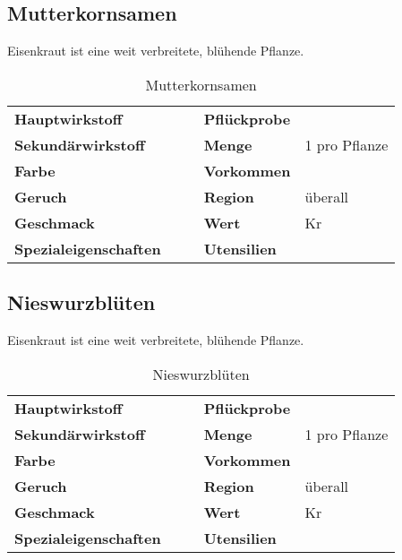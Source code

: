 \subsection{Mutterkornsamen}
Eisenkraut ist eine weit verbreitete, blühende Pflanze. 

\begin{table}[h]
\begin{center}
\begin{tabular}{|l|l|p{1cm}|l|l|}
	\cline{1-2} \cline{4-5}
	\textbf{Hauptwirkstoff} &  && \textbf{Pflückprobe} &  \\ \cline{1-2} \cline{4-5}
	\textbf{Sekundärwirkstoff} &  && \textbf{Menge} & 1 pro Pflanze \\ \cline{1-2} \cline{4-5}
	\textbf{Farbe} &  && \textbf{Vorkommen} &  \\ \cline{1-2} \cline{4-5}
	\textbf{Geruch} &  && \textbf{Region} & überall \\ \cline{1-2} \cline{4-5}
	\textbf{Geschmack} &  && \textbf{Wert} & Kr \\ \cline{1-2} \cline{4-5}
	\textbf{Spezialeigenschaften} &  && \textbf{Utensilien} &  \\ \cline{1-2} \cline{4-5}
\end{tabular}
\end{center}
\caption{Mutterkornsamen}
\label{tab:mutterkornsamen}
\end{table}


\subsection{Nieswurzblüten}
Eisenkraut ist eine weit verbreitete, blühende Pflanze. 

\begin{table}[h]
\begin{center}
\begin{tabular}{|l|l|p{1cm}|l|l|}
	\cline{1-2} \cline{4-5}
	\textbf{Hauptwirkstoff} &  && \textbf{Pflückprobe} &  \\ \cline{1-2} \cline{4-5}
	\textbf{Sekundärwirkstoff} &  && \textbf{Menge} & 1 pro Pflanze \\ \cline{1-2} \cline{4-5}
	\textbf{Farbe} &  && \textbf{Vorkommen} &  \\ \cline{1-2} \cline{4-5}
	\textbf{Geruch} &  && \textbf{Region} & überall \\ \cline{1-2} \cline{4-5}
	\textbf{Geschmack} &  && \textbf{Wert} & Kr \\ \cline{1-2} \cline{4-5}
	\textbf{Spezialeigenschaften} &  && \textbf{Utensilien} &  \\ \cline{1-2} \cline{4-5}
\end{tabular}
\end{center}
\caption{Nieswurzblüten}
\label{tab:nieswurzblueten}
\end{table}


